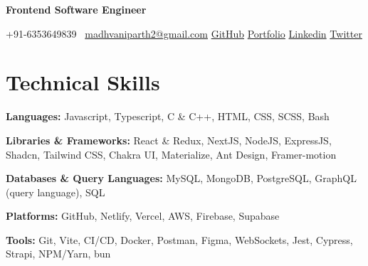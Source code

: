 \documentclass[11pt,a4paper,sans]{moderncv}
\begin{document}
\makecvtitle
\vspace*{-16mm}
\begin{center}\textbf{ Frontend Software Engineer }\end{center}

\begin{center}
{+91-6353649839}~ \quad \href{mailto:madhvaniparth2@gmail.com}{madhvaniparth2@gmail.com} \quad
\href{https://github.com/ParthMadhvani2}{\color{blue}GitHub} \quad
\href{https://parthmadhvani2.vercel.app/}{\color{blue}Portfolio}  \quad
\href{https://www.linkedin.com/in/parthmadhvani2/}{\color{blue}Linkedin} \quad
\href{https://twitter.com/parthmadhvani2}{\color{blue}Twitter}
\end{center}



\section{Technical Skills}
\begin{itemize}[leftmargin=0in, label={}]
\normalsize{
    \item \textbf{Languages:} Javascript, Typescript, C \& C++, HTML, CSS, SCSS, Bash
    \item \textbf{Libraries \& Frameworks:} React \& Redux, NextJS, NodeJS, ExpressJS, Shadcn, Tailwind CSS, Chakra UI, Materialize, Ant Design, Framer-motion
    \item \textbf{Databases \& Query Languages:} MySQL, MongoDB, PostgreSQL, GraphQL (query language), SQL
    \item \textbf{Platforms:} GitHub, Netlify, Vercel, AWS, Firebase, Supabase
    \item \textbf{Tools:} Git, Vite, CI/CD, Docker, Postman, Figma, WebSockets, Jest, Cypress, Strapi, NPM/Yarn, bun
}
\end{itemize}

\end{document}
